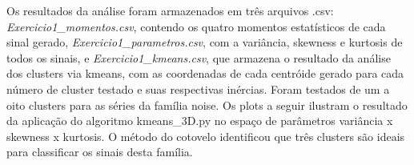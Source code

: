Os resultados da análise foram armazenados em três arquivos .csv: \textit{Exercicio1\_momentos.csv}, contendo os quatro momentos estatísticos de cada sinal gerado, \textit{Exercicio1\_parametros.csv}, com a variância, skewness e kurtosis de todos os sinais, e \textit{Exercicio1\_kmeans.csv}, que armazena o resultado da análise dos clusters via kmeans, com as coordenadas de cada centróide gerado para cada número de cluster testado e suas respectivas inércias. Foram testados de um a oito clusters para as séries da família noise. Os plots a seguir ilustram o resultado da aplicação do algoritmo kmeans\_3D.py no espaço de parâmetros variância x skewness x kurtosis. O método do cotovelo identificou que três clusters são ideais para classificar os sinais desta família.

\begin{figure}[ht!]
	\vspace{0mm}	%
	\begin{center}
	\end{center}
	\vspace{-2mm}	%
	\label{ex1_fig2}
\end{figure}

